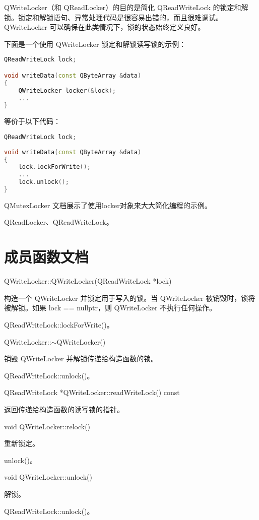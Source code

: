 QWriteLocker（和 QReadLocker）的目的是简化 QReadWriteLock 的锁定和解锁。锁定和解锁语句、异常处理代码是很容易出错的，而且很难调试。QWriteLocker 可以确保在此类情况下，锁的状态始终定义良好。

下面是一个使用 QWriteLocker 锁定和解锁读写锁的示例：


\begin{lstlisting}[language=C++]
QReadWriteLock lock;

void writeData(const QByteArray &data)
{
	QWriteLocker locker(&lock);
	...
}
\end{lstlisting}

等价于以下代码：

\begin{lstlisting}[language=C++]
QReadWriteLock lock;
	
void writeData(const QByteArray &data)
{
	lock.lockForWrite();
	...
	lock.unlock();
}
\end{lstlisting}

QMutexLocker 文档展示了使用locker对象来大大简化编程的示例。

\begin{notice}[另请参阅]
QReadLocker、QReadWriteLock。
\end{notice}


\section{成员函数文档}

QWriteLocker::QWriteLocker(QReadWriteLock *lock)


构造一个 QWriteLocker 并锁定用于写入的锁。当 QWriteLocker 被销毁时，锁将被解锁。如果 lock == nullptr，则 QWriteLocker 不执行任何操作。


\begin{notice}[另请参阅]
QReadWriteLock::lockForWrite()。
\end{notice}



QWriteLocker::$\sim$QWriteLocker()

销毁 QWriteLocker 并解锁传递给构造函数的锁。

\begin{notice}[另请参阅]
QReadWriteLock::unlock()。
\end{notice}

QReadWriteLock *QWriteLocker::readWriteLock() const

返回传递给构造函数的读写锁的指针。

void QWriteLocker::relock()

重新锁定。

\begin{notice}[另请参阅]
unlock()。
\end{notice}

void QWriteLocker::unlock()

解锁。

\begin{notice}[另请参阅]
QReadWriteLock::unlock()。
\end{notice}


